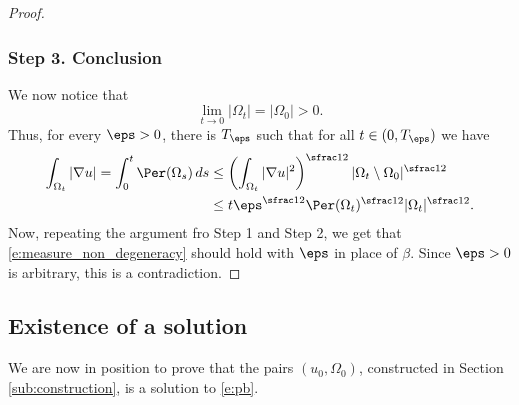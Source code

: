 \begin{proof}
\subsubsection*{Step 3. Conclusion} We now notice that
\[\lim_{t\to0}|\Omega_t|=|\Omega_0|>0.\]
Thus, for every $\eps>0$, there is $T_\eps$ such that for all $t\in(0,T_\eps)$ we have
\begin{equation}
\begin{split}
\int_{\Omega_t}|\nabla u|=\int_0^t\Per(\Omega_s)\,ds&\le \left(\int_{\Omega_t}|\nabla u|^2\right)^{\sfrac12}|\Omega_t\setminus\Omega_0|^{\sfrac12}\\
&\le t\eps ^{\sfrac12}\Per(\Omega_t)^{\sfrac12}|\Omega_t|^{\sfrac12}.
\end{split}
\end{equation}
Now, repeating the argument fro Step 1 and Step 2, we get that \eqref{e:measure_non_degeneracy} should hold with $\eps$ in place of $\beta$. Since $\eps>0$ is arbitrary, this is a contradiction.
\end{proof}

\subsection{Existence of a solution}
We are now in position to prove that the pairs $(u_0,\Omega_0)$, constructed in Section \ref{sub:construction}, is a solution to \eqref{e:pb}.

